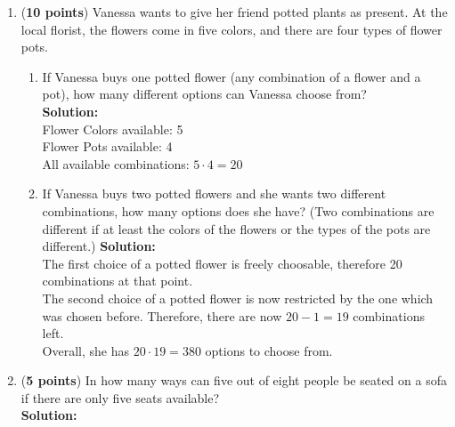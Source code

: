 \documentclass[a4paper]{article}
\begin{document}
\begin{enumerate}


\item (\textbf{10 points}) Vanessa wants to give her friend potted plants as present. At the local florist, the flowers come in five colors, and there are four types of flower pots.


\begin{enumerate}
	\item If Vanessa buys one potted flower (any combination of a flower and a pot), how many different options can Vanessa choose from?\\
	\textbf{Solution:}\\
	
	
Flower Colors available: 5\\
Flower Pots available: 4\\

All available combinations: $5 \cdot 4 = 20$\\	
	
	
	
	\item If Vanessa buys two potted flowers and she wants two different combinations, how many options does she have? (Two combinations are different if at least the colors of the flowers or the types of the pots are different.)
	\textbf{Solution:}\\
	
	
	
	
	
	
	
	
The first choice of a potted flower is freely choosable, therefore 20 combinations at that point.\\

The second choice of a potted flower is now restricted by the one which was chosen before. Therefore, there are now $20 - 1 = 19$ combinations left.\\

Overall, she has $20 \cdot 19 = 380$ options to choose from.\\



	
\end{enumerate}



\item (\textbf{5 points}) In how many ways can five out of eight people be seated on a sofa if there are only five seats available?\\
\textbf{Solution:}\\


\end{enumerate}
\end{document}
